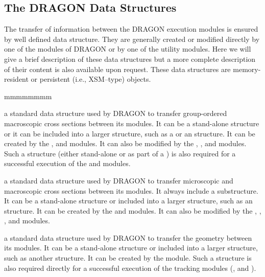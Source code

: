\subsection{The DRAGON Data Structures}\label{sect:DragonDataStructures}

The transfer of information between the DRAGON execution modules is
ensured by well defined data structure. They are generally created or
modified directly by one of the modules of DRAGON or by one of the utility
modules. Here we will give a brief description of these data structures but a
more complete description of their content is also available upon
request.\cite{DragonDataStructures} These data structures are memory-resident or
persistent (i.e., XSM--type) objects.

\begin{ListeDeDescription}{mmmmmmmm}

\item[\dds{macrolib}]  a standard data structure used by DRAGON to transfer
group-ordered macroscopic cross sections between its modules. It can be a
stand-alone structure or it can be included into a larger structure, such as a
 or an  structure. It can be created by the
,  and  modules. It can also be modified
by the , ,  and  modules. Such a structure (either stand-alone
or as part of a ) is also required for a successful execution of the
 and  modules.

\item[\dds{microlib}] a standard data structure used by DRAGON to transfer
microscopic and macroscopic cross sections between its modules. It always
include a  substructure. It can be a stand-alone structure or
included into a larger structure, such as an  structure. It
can be created by the  and  modules. It can also be
modified by the , , ,  and  modules. 

\item[\dds{geometry}] a standard data structure used by DRAGON to transfer
the geometry between its modules. It can be a stand-alone structure or
included into a larger structure, such as another  structure. It can be created by the  module. Such a structure is also
required directly for a successful execution of the tracking modules (,
 and ).


\end{ListeDeDescription}
